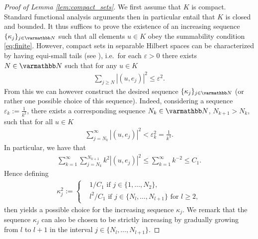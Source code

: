 \documentclass[12pt,twoside]{amsart}
\numberwithin{equation}{section}
\renewcommand{\leq}{\leqslant}
\renewcommand{\geq}{\geqslant}
\newcommand{\eps}{\varepsilon}
\begin{document}
\begin{appendix}
\begin{proof}[Proof of Lemma \ref{lem:compact_sets}]
We first assume that $K$ is compact. Standard functional analysis arguments then in particular entail that $K$ is closed and bounded. It thus suffices to prove the existence of an increasing sequence $\{\kappa_j\}_{j\in \N}$ such that all elements $u\in K$ obey the summability condition \eqref{eq:finite}. However, compact sets in separable Hilbert spaces can be characterized by having equi-small tails (see \cite[Proposition 25, Section 12, Chapter 3]{Melrose}), i.e.\ for each $\eps>0$ there exists $N\in \N$ such that for any $u\in K$
\begin{align*}
\sum\limits_{j\geq N}|(u,e_j)|^2\leq \eps^2.
\end{align*}
From this we can however construct the desired sequence $\{\kappa_j\}_{j\in \N}$ (or rather one possible choice of this sequence). Indeed, considering a sequence $\eps_k:= \frac{1}{k^2}$, there exists a corresponding sequence $N_k \in \N$, $N_{k+1}> N_{k}$, such that for all $u\in K$
\begin{align*}
\sum\limits_{j=N_k}^{\infty}|(u, e_j)|^2 < \eps_k^2= \frac{1}{k^4}.
\end{align*}
In particular, we have that
\begin{align*}
\sum\limits_{k=1}^{\infty} \sum\limits_{j=N_k}^{N_{k+1}} k^2 |(u,e_j)|^2 \leq \sum\limits_{k=1}^{\infty} k^{-2} \leq C_1.
\end{align*}
Hence defining 
\begin{align*}
\kappa_j^2:=
\left\{ 
\begin{array}{ll}
& 1/C_1 \mbox{ if } j \in \{1,\dots, N_2\},\\
& l^2/C_1 \mbox{ if } j \in \{N_l, \dots, N_{l+1}\} \mbox{ for } l \geq 2,
\end{array}
\right.
\end{align*}
then yields a possible choice for the increasing sequence $\kappa_j$. We remark that the sequence $\kappa_j$ can also be chosen to be strictly increasing by gradually growing from $l$ to $l+1$ in the interval $j\in\{N_l, \dots, N_{l+1}\}$.



\end{proof}
\end{appendix}
\end{document}
